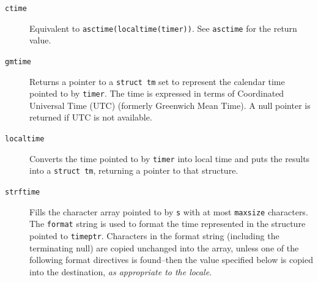 \begin{description}
   

   \item[\texttt{ctime}] Equivalent to \texttt{asctime(localtime(timer))}.  See
    \texttt{asctime} for the return value.

   \item[\texttt{gmtime}] Returns a pointer to a \texttt{struct tm}  set  to  represent  the
    calendar time pointed to by \texttt{timer}.  The time is expressed in
    terms of Coordinated Universal  Time  (UTC)  (formerly Greenwich  Mean
    Time).  A null pointer is returned if UTC is not available.

   \item[\texttt{localtime}] Converts the time pointed to by \texttt{timer} into local time and
    puts the results into a \texttt{struct tm}, returning a pointer to that
    structure.

   \item[\texttt{strftime}] 
    Fills the character array pointed to by \texttt{s}  with  at  most
     \texttt{maxsize}  characters.  The \texttt{format} string is used
     to format the time represented in the structure pointed to
     \texttt{timeptr}.  Characters   in   the   format   string
     (including  the terminating null) are copied unchanged  into  the  array,
     unless  one of the following format directives is found--then the
     value  specified  below  is  copied  into  the destination, \textit{as
     appropriate to the locale}.



\end{description}
